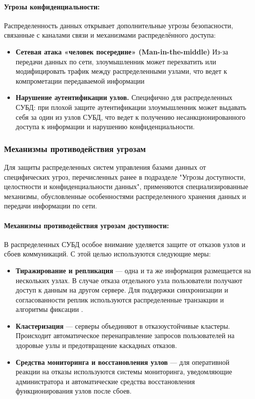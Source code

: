 \paragraph{Угрозы конфиденциальности:}

Распределенность данных открывает дополнительные угрозы безопасности, связанные с каналами связи и механизмами распределённого доступа:

\begin{itemize} 
    \item \textbf{Сетевая атака «человек посередине» (Man-in-the-middle)} Из-за передачи данных по сети, злоумышленник может перехватить или модифицировать трафик между распределенными узлами, что ведет к компрометации передаваемой информации  
    \item \textbf{Нарушение аутентификации узлов.} Специфично для распределенных СУБД: при плохой защите аутентификации злоумышленник может выдавать себя за один из узлов СУБД, что ведет к получению несанкционированного доступа к информации и нарушению конфиденциальности. 
\end{itemize}

\subsubsection{Механизмы противодействия угрозам}

Для защиты распределенных систем управления базами данных от специфических угроз, перечисленных ранее в подразделе "Угрозы доступности, целостности и конфиденциальности данных", применяются специализированные механизмы, обусловленные особенностями распределенного хранения данных и передачи информации по сети.

\paragraph{Механизмы противодействия угрозам доступности:}

В распределенных СУБД особое внимание уделяется защите от отказов узлов и сбоев коммуникаций. С этой целью используются следующие меры:

\begin{itemize} 
    \item \textbf{Тиражирование и репликация} — одна и та же информация размещается на нескольких узлах. В случае отказа отдельного узла пользователи получают доступ к данным на другом сервере. Для поддержки синхронизации и согласованности реплик используются распределенные транзакции и алгоритмы фиксации \autocite{Tanenbaum}.
    \item \textbf{Кластеризация} — серверы объединяют в отказоустойчивые кластеры. Происходит автоматическое перенаправление запросов пользователей на здоровые узлы и предотвращение каскадных отказов.
    \item \textbf{Средства мониторинга и восстановления узлов} — для оперативной реакции на отказы используются системы мониторинга, уведомляющие администратора и автоматические средства восстановления функционирования узлов после сбоев.
\end{itemize}

